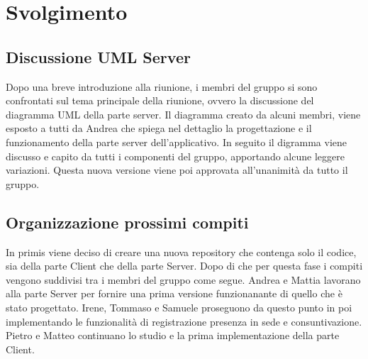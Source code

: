 \section{Svolgimento}
\subsection{Discussione UML Server}
Dopo una breve introduzione alla riunione, i membri del gruppo si sono confrontati sul tema principale della riunione, ovvero la discussione del diagramma UML della parte server. Il diagramma creato da alcuni membri, viene esposto a tutti da Andrea che spiega nel dettaglio la progettazione e il funzionamento della parte server dell'applicativo. In seguito il digramma viene discusso e capito da tutti i componenti del gruppo, apportando alcune leggere variazioni. Questa nuova versione viene poi approvata all'unanimità da tutto il gruppo.
\subsection{Organizzazione prossimi compiti}
In primis viene deciso di creare una nuova repository che contenga solo il codice, sia della parte Client che della parte Server. Dopo di che per questa fase i compiti vengono suddivisi tra i membri del gruppo come segue. Andrea e Mattia lavorano alla parte Server per fornire una prima versione funzionanante di quello che è stato progettato. Irene, Tommaso e Samuele proseguono da questo punto in poi implementando le funzionalità di registrazione presenza in sede e consuntivazione. Pietro e Matteo continuano lo studio e la prima implementazione della parte Client.


